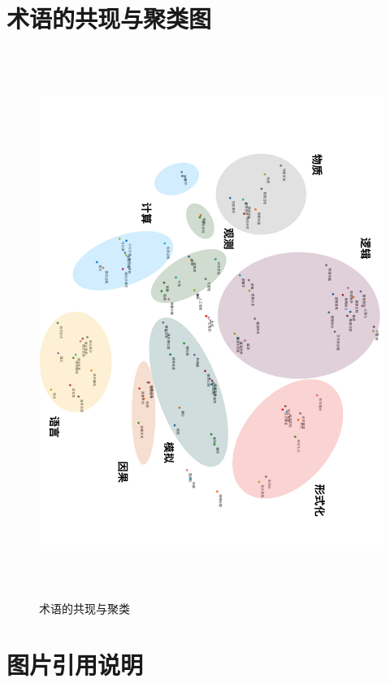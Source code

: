 \documentclass[a4paper,12pt]{article}
\begin{document}
\newpage
{}
{}



\newpage
{}
{}
\printindex
\printglossaries

\newpage
\appendix
\setcounter{page}{20}
\section{术语的共现与聚类图}

\begin{figure}[ht]
\centering
\includegraphics[height=7in]{images/concepts.png}
\caption{术语的共现与聚类}
\end{figure}

\newpage
\section{图片引用说明}
\end{document}

